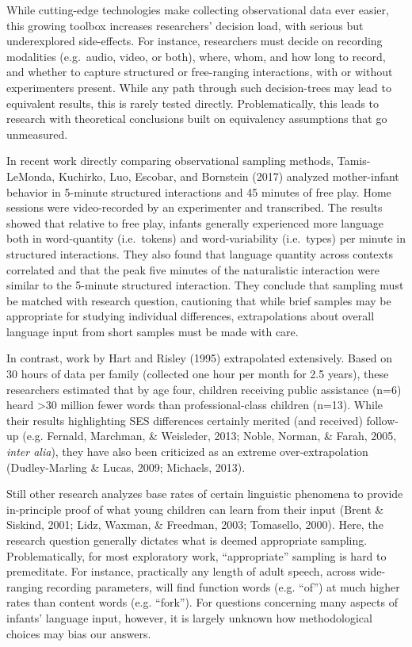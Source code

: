 \documentclass[floatsintext,man]{apa6}
\theoremstyle{definition}
\theoremstyle{definition}
\theoremstyle{definition}
\theoremstyle{remark}
\begin{document}
While cutting-edge technologies make collecting observational data ever
easier, this growing toolbox increases researchers' decision load, with
serious but underexplored side-effects. For instance, researchers must
decide on recording modalities (e.g.~audio, video, or both), where,
whom, and how long to record, and whether to capture structured or
free-ranging interactions, with or without experimenters present. While
any path through such decision-trees may lead to equivalent results,
this is rarely tested directly. Problematically, this leads to research
with theoretical conclusions built on equivalency assumptions that go
unmeasured.

In recent work directly comparing observational sampling methods,
Tamis-LeMonda, Kuchirko, Luo, Escobar, and Bornstein (2017) analyzed
mother-infant behavior in 5-minute structured interactions and 45
minutes of free play. Home sessions were video-recorded by an
experimenter and transcribed. The results showed that relative to free
play, infants generally experienced more language both in word-quantity
(i.e.~tokens) and word-variability (i.e.~types) per minute in structured
interactions. They also found that language quantity across contexts
correlated and that the peak five minutes of the naturalistic
interaction were similar to the 5-minute structured interaction. They
conclude that sampling must be matched with research question,
cautioning that while brief samples may be appropriate for studying
individual differences, extrapolations about overall language input from
short samples must be made with care.

In contrast, work by Hart and Risley (1995) extrapolated extensively.
Based on 30 hours of data per family (collected one hour per month for
2.5 years), these researchers estimated that by age four, children
receiving public assistance (n=6) heard \textgreater{}30 million fewer
words than professional-class children (n=13). While their results
highlighting SES differences certainly merited (and received) follow-up
(e.g. Fernald, Marchman, \& Weisleder, 2013; Noble, Norman, \& Farah,
2005, \emph{inter alia}), they have also been criticized as an extreme
over-extrapolation (Dudley-Marling \& Lucas, 2009; Michaels, 2013).

Still other research analyzes base rates of certain linguistic phenomena
to provide in-principle proof of what young children can learn from
their input (Brent \& Siskind, 2001; Lidz, Waxman, \& Freedman, 2003;
Tomasello, 2000). Here, the research question generally dictates what is
deemed appropriate sampling. Problematically, for most exploratory work,
\enquote{appropriate} sampling is hard to premeditate. For instance,
practically any length of adult speech, across wide-ranging recording
parameters, will find function words (e.g. \enquote{of}) at much higher
rates than content words (e.g. \enquote{fork}). For questions concerning
many aspects of infants' language input, however, it is largely unknown
how methodological choices may bias our answers.
\end{document}
